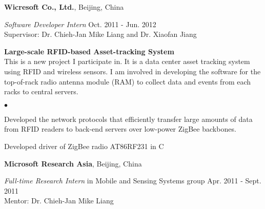 \documentclass[margin,line]{res}
\newenvironment{list1}{
  \begin{list}{\ding{113}}{
      \setlength{\itemsep}{0in}
      \setlength{\parsep}{0in} \setlength{\parskip}{0in}
      \setlength{\topsep}{0in} \setlength{\partopsep}{0in}
      \setlength{\leftmargin}{0.17in}}}{\end{list}}
\newenvironment{list2}{
  \begin{list}{$\bullet$}{
      \setlength{\itemsep}{0in}
      \setlength{\parsep}{0in} \setlength{\parskip}{0in}
      \setlength{\topsep}{0in} \setlength{\partopsep}{0in}
      \setlength{\leftmargin}{0.2in}}}{\end{list}}
\begin{document}
\begin{resume}
      {\bf Wicresoft Co., Ltd.}, Beijing, China

      \vspace{-.3cm}
      {\em Software Developer Intern} \hfill Oct. 2011 - Jun. 2012\\
      Supervisor: Dr. Chieh-Jan Mike Liang and Dr. Xiaofan Jiang\\

      \vspace*{-.1in}
      \begin{list1}
        \item[] {\bf Large-scale RFID-based Asset-tracking System}\\
        This is a new project I participate in. It is a data center asset tracking system using RFID and wireless sensors. I am involved in developing the software for the top-of-rack radio antenna module (RAM) to collect data and events from each racks to central servers.
        \vspace*{.05in}
        \begin{list2}
          \item Developed the network protocols that efficiently transfer large amounts of data from RFID readers to back-end servers over low-power ZigBee backbones.
          \item Developed driver of ZigBee radio AT86RF231 in C
        \end{list2}
      \end{list1}

      {\bf Microsoft Research Asia}, Beijing, China

      \vspace{-.3cm}
      {\em Full-time Research Intern} in Mobile and Sensing Systems group \hfill Apr. 2011 - Sept. 2011\\
      Mentor: Dr. Chieh-Jan Mike Liang\\


\end{resume}
\end{document}
